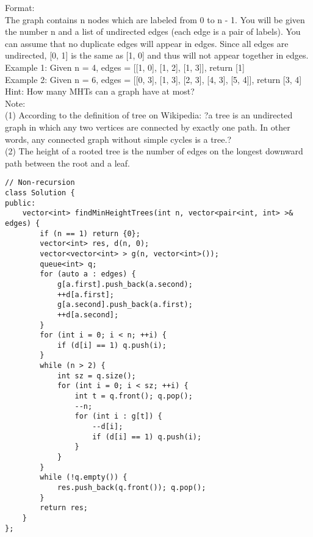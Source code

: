 Format:\\
The graph contains n nodes which are labeled from 0 to n - 1. You will be given the number n and a list of undirected edges (each edge is a pair of labels). You can assume that no duplicate edges will appear in edges. Since all edges are undirected, [0, 1] is the same as [1, 0] and thus will not appear together in edges.\\

Example 1:
Given n = 4, edges = [[1, 0], [1, 2], [1, 3]], return [1]\\
Example 2:
Given n = 6, edges = [[0, 3], [1, 3], [2, 3], [4, 3], [5, 4]], return [3, 4]\\

Hint:
    How many MHTs can a graph have at most?\\
    
Note:\\
(1) According to the definition of tree on Wikipedia: ?a tree is an undirected graph in which any two vertices are connected by exactly one path. In other words, any connected graph without simple cycles is a tree.?\\
(2) The height of a rooted tree is the number of edges on the longest downward path between the root and a leaf. \\

\begin{lstlisting}
// Non-recursion
class Solution {
public:
    vector<int> findMinHeightTrees(int n, vector<pair<int, int> >& edges) {
        if (n == 1) return {0};
        vector<int> res, d(n, 0);
        vector<vector<int> > g(n, vector<int>());
        queue<int> q;
        for (auto a : edges) {
            g[a.first].push_back(a.second);
            ++d[a.first];
            g[a.second].push_back(a.first);
            ++d[a.second];
        }
        for (int i = 0; i < n; ++i) {
            if (d[i] == 1) q.push(i);
        }
        while (n > 2) {
            int sz = q.size();
            for (int i = 0; i < sz; ++i) {
                int t = q.front(); q.pop();
                --n;
                for (int i : g[t]) {
                    --d[i];
                    if (d[i] == 1) q.push(i);
                }
            }
        }
        while (!q.empty()) {
            res.push_back(q.front()); q.pop();
        }
        return res;
    }
};
\end{lstlisting}





